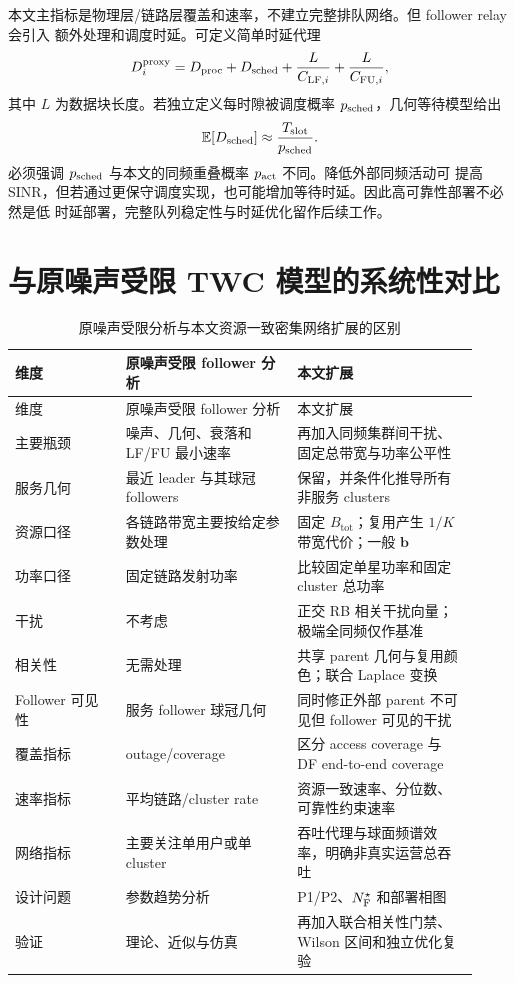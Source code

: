 \documentclass[UTF8,a4paper,11pt]{ctexart}
\newcommand{\E}{\mathbb E}
\newcommand{\Btot}{B_{\mathrm{tot}}}
\newcommand{\bvec}{\bm b}
\begin{document}
本文主指标是物理层/链路层覆盖和速率，不建立完整排队网络。但 follower relay 会引入
额外处理和调度时延。可定义简单时延代理
\begin{equation}
 D_i^{\rm proxy}
 =
 D_{\rm proc}
 +D_{\rm sched}
 +\frac{L}{C_{{\rm LF},i}}
 +\frac{L}{C_{{\rm FU},i}},
 \label{eq:delay-proxy}
\end{equation}
其中 $L$ 为数据块长度。若独立定义每时隙被调度概率 $p_{\rm sched}$，几何等待模型给出
\begin{equation}
 \E[D_{\rm sched}]
 \approx\frac{T_{\rm slot}}{p_{\rm sched}}.
 \label{eq:scheduling-delay}
\end{equation}
必须强调 $p_{\rm sched}$ 与本文的同频重叠概率 $p_{\rm act}$ 不同。降低外部同频活动可
提高 SINR，但若通过更保守调度实现，也可能增加等待时延。因此高可靠性部署不必然是低
时延部署，完整队列稳定性与时延优化留作后续工作。

\section{与原噪声受限 TWC 模型的系统性对比}

\begin{longtable}{p{0.22\linewidth}p{0.34\linewidth}p{0.36\linewidth}}
\caption{原噪声受限分析与本文资源一致密集网络扩展的区别}
\label{tab:comparison}\\
\toprule
维度 & 原噪声受限 follower 分析 & 本文扩展\\
\midrule
\endfirsthead
\toprule
维度 & 原噪声受限 follower 分析 & 本文扩展\\
\midrule
\endhead
主要瓶颈 & 噪声、几何、衰落和 LF/FU 最小速率 & 再加入同频集群间干扰、固定总带宽与功率公平性\\
服务几何 & 最近 leader 与其球冠 followers & 保留，并条件化推导所有非服务 clusters\\
资源口径 & 各链路带宽主要按给定参数处理 & 固定 $\Btot$；复用产生 $1/K$ 带宽代价；一般 $\bvec$\\
功率口径 & 固定链路发射功率 & 比较固定单星功率和固定 cluster 总功率\\
干扰 & 不考虑 & 正交 RB 相关干扰向量；极端全同频仅作基准\\
相关性 & 无需处理 & 共享 parent 几何与复用颜色；联合 Laplace 变换\\
Follower 可见性 & 服务 follower 球冠几何 & 同时修正外部 parent 不可见但 follower 可见的干扰\\
覆盖指标 & outage/coverage & 区分 access coverage 与 DF end-to-end coverage\\
速率指标 & 平均链路/cluster rate & 资源一致速率、分位数、可靠性约束速率\\
网络指标 & 主要关注单用户或单 cluster & 吞吐代理与球面频谱效率，明确非真实运营总吞吐\\
设计问题 & 参数趋势分析 & P1/P2、$N_{\rm F}^{\star}$ 和部署相图\\
验证 & 理论、近似与仿真 & 再加入联合相关性门禁、Wilson 区间和独立优化复验\\
\bottomrule
\end{longtable}
\end{document}
